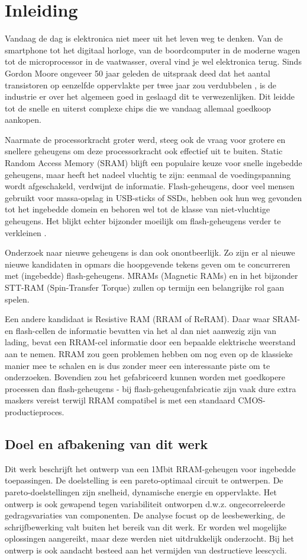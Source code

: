 \chapter{Inleiding}
\label{inleiding}

Vandaag de dag is elektronica niet meer uit het leven weg te denken. Van de smartphone tot het digitaal horloge, van de boordcomputer in de moderne wagen tot de microprocessor in de vaatwasser, overal vind je wel elektronica terug.
Sinds Gordon Moore ongeveer 50 jaar geleden de uitspraak deed dat het aantal transistoren op eenzelfde oppervlakte per twee jaar zou verdubbelen \cite{Moo65}, is de industrie er over het algemeen goed in geslaagd dit te verwezenlijken. Dit leidde tot de snelle en uiterst complexe chips die we vandaag allemaal goedkoop aankopen.

Naarmate de processorkracht groter werd, steeg ook de vraag voor grotere en snellere geheugens om deze processorkracht ook effectief uit te buiten. Static Random Access Memory (SRAM) blijft een populaire keuze voor snelle ingebedde geheugens, maar heeft het nadeel vluchtig te zijn: eenmaal de voedingspanning wordt afgeschakeld, verdwijnt de informatie. Flash-geheugens, door veel mensen gebruikt voor massa-opslag in USB-sticks of SSDs, hebben ook hun weg gevonden tot het ingebedde domein en behoren wel tot de klasse van niet-vluchtige geheugens.
Het blijkt echter bijzonder moeilijk om flash-geheugens verder te verkleinen \cite{Pra10}.

Onderzoek naar nieuwe geheugens is dan ook onontbeerlijk. Zo zijn er al nieuwe nieuwe kandidaten in opmars die hoopgevende tekens geven om te concurreren met (ingebedde) flash-geheugens. MRAMs (Magnetic RAMs) en in het bijzonder STT-RAM (Spin-Transfer Torque) zullen op termijn een belangrijke rol gaan spelen.

Een andere kandidaat is Resistive RAM (RRAM of ReRAM). Daar waar SRAM- en flash-cellen de informatie bevatten via het al dan niet aanwezig zijn van lading, bevat een RRAM-cel informatie door een bepaalde elektrische weerstand aan te nemen. RRAM zou geen problemen hebben om nog even op de klassieke manier mee te schalen en is dus zonder meer een interessante piste om te onderzoeken. Bovendien zou het gefabriceerd kunnen worden met goedkopere processen dan flash-geheugens - bij flash-geheugenfabricatie zijn vaak dure extra maskers vereist terwijl RRAM compatibel is met een standaard CMOS-productieproces.

\section{Doel en afbakening van dit werk}
Dit werk beschrijft het ontwerp van een 1Mbit RRAM-geheugen voor ingebedde toepassingen. De doelstelling is een pareto-optimaal circuit te ontwerpen. De pareto-doelstellingen zijn snelheid, dynamische energie en oppervlakte. Het ontwerp is ook gewapend tegen variabiliteit ontworpen d.w.z. ongecorreleerde gedragsvariaties van componenten. De analyse focust op de leesbewerking, de schrijfbewerking valt buiten het bereik van dit werk. Er worden wel mogelijke oplossingen aangereikt, maar deze werden niet uitdrukkelijk onderzocht. Bij het ontwerp is ook aandacht besteed aan het vermijden van destructieve leescycli.

